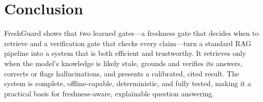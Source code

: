 \documentclass[conference]{IEEEtran}
\begin{document}
\section{Conclusion}
FreshGuard shows that two learned gates---a freshness gate that decides when to retrieve and
a verification gate that checks every claim---turn a standard RAG pipeline into a system that
is both efficient and trustworthy. It retrieves only when the model's knowledge is likely
stale, grounds and verifies its answers, corrects or flags hallucinations, and presents a
calibrated, cited result. The system is complete, offline-capable, deterministic, and fully
tested, making it a practical basis for freshness-aware, explainable question answering.



\end{document}
